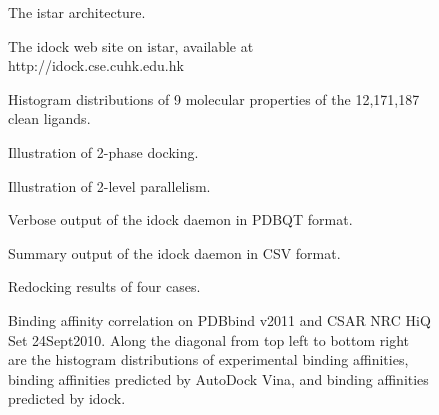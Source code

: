 \documentclass[12pt]{article}
\begin{document}

\clearpage





\clearpage

\begin{figure}
\caption{\label{architecture} The istar architecture.}
\end{figure}

\begin{figure}
\caption{\label{idock} The idock web site on istar, available at http://idock.cse.cuhk.edu.hk}
\end{figure}

\begin{figure}
\caption{\label{LigandProperties} Histogram distributions of 9 molecular properties of the 12,171,187 clean ligands.}
\end{figure}

\begin{figure}
\caption{\label{2PhaseDocking} Illustration of 2-phase docking.}
\end{figure}

\begin{figure}
\caption{\label{2LevelParallelism} Illustration of 2-level parallelism.}
\end{figure}

\begin{figure}
\caption{\label{OutputPDBQT} Verbose output of the idock daemon in PDBQT format.}
\end{figure}

\begin{figure}
\caption{\label{OutputCSV} Summary output of the idock daemon in CSV format.}
\end{figure}

\begin{figure}
\caption{\label{Redocking} Redocking results of four cases.}
\end{figure}

\begin{figure}
\caption{\label{FECorrelation} Binding affinity correlation on PDBbind v2011 and CSAR NRC HiQ Set 24Sept2010. Along the diagonal from top left to bottom right are the histogram distributions of experimental binding affinities, binding affinities predicted by AutoDock Vina, and binding affinities predicted by idock.}
\end{figure}
\end{document}

